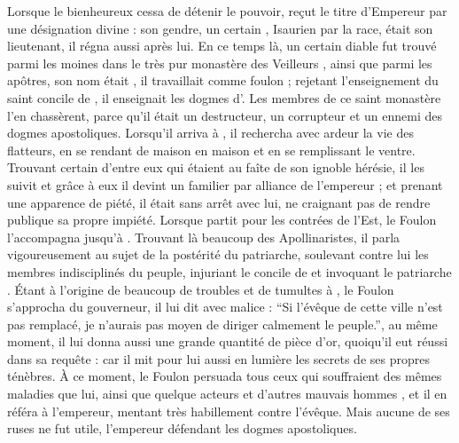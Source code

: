 Lorsque le bienheureux  cessa de détenir le pouvoir,  reçut le titre d'Empereur par une désignation divine : 
son gendre, un certain ,  Ιsaurien par la race, était son lieutenant,
il régna aussi après lui. %
En ce temps là, un certain diable fut trouvé parmi les moines dans le très pur monastère des Veilleurs , ainsi que  parmi les apôtres, son nom était ,  %
il travaillait comme foulon ;  rejetant l'enseignement du saint concile de , il enseignait les dogmes d'.
Les membres de ce saint monastère l'en chassèrent, parce qu'il était un destructeur, un corrupteur et un ennemi des dogmes apostoliques. %
Lorsqu'il arriva à , il rechercha avec ardeur la vie des flatteurs, en se rendant de maison en maison et en se remplissant le ventre.
Trouvant certain d'entre eux qui étaient au faîte de son ignoble hérésie, il les suivit et  grâce à eux il devint un familier par alliance  de l'empereur ; %
et prenant une apparence de piété, il était sans arrêt avec lui, ne craignant pas de rendre publique sa propre impiété.
Lorsque  partit pour les contrées de l'Est, le Foulon l'accompagna jusqu'à .
Trouvant là beaucoup des Apollinaristes,  il parla vigoureusement au sujet de la postérité du patriarche, soulevant contre lui les membres indisciplinés du peuple, injuriant le concile de  et invoquant le patriarche .
Étant à l'origine de beaucoup de troubles et  de tumultes à , 
le Foulon s'approcha du gouverneur, il lui dit avec malice : 
\enquote{Si l'évêque de cette ville n'est pas remplacé, je n'aurais pas moyen de diriger calmement le peuple.}, 
au même moment, il lui donna aussi une grande quantité de pièce d'or, quoiqu'il eut réussi dans sa requête : car il mit pour lui aussi en lumière les secrets de ses propres ténèbres.
À ce moment, le Foulon persuada tous ceux qui souffraient des mêmes maladies que lui, ainsi que quelque acteurs et d'autres mauvais hommes , 
et il en référa à l'empereur, mentant très habillement contre l'évêque. 
Mais aucune de ses ruses ne fut utile, l'empereur défendant les dogmes apostoliques.

